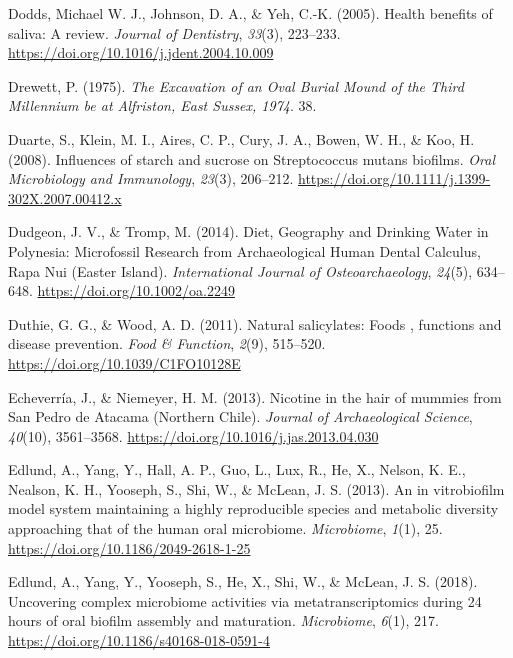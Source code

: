 \documentclass[
  letterpaper,
]{book}
\newlength{\cslhangindent}
\newlength{\cslentryspacingunit} %
\newenvironment{CSLReferences}[2] %
 {%
  \setlength{\parindent}{0pt}
  \ifodd #1
  \let\oldpar\par
  \def\par{\hangindent=\cslhangindent\oldpar}
  \fi
  \setlength{\parskip}{#2\cslentryspacingunit}
 }%
 {}
\begin{document}
\begin{CSLReferences}{1}{0}
\leavevmode{}%
Dodds, Michael W. J., Johnson, D. A., \& Yeh, C.-K. (2005). Health
benefits of saliva: A review. \emph{Journal of Dentistry}, \emph{33}(3),
223--233. \url{https://doi.org/10.1016/j.jdent.2004.10.009}

\leavevmode{}%
Drewett, P. (1975). \emph{The {Excavation} of an {Oval Burial Mound} of
the {Third Millennium} be at {Alfriston}, {East Sussex}, 1974}. 38.

\leavevmode{}%
Duarte, S., Klein, M. I., Aires, C. P., Cury, J. A., Bowen, W. H., \&
Koo, H. (2008). Influences of starch and sucrose on {Streptococcus}
mutans biofilms. \emph{Oral Microbiology and Immunology}, \emph{23}(3),
206--212. \url{https://doi.org/10.1111/j.1399-302X.2007.00412.x}

\leavevmode{}%
Dudgeon, J. V., \& Tromp, M. (2014). Diet, {Geography} and {Drinking
Water} in {Polynesia}: {Microfossil Research} from {Archaeological Human
Dental Calculus}, {Rapa Nui} ({Easter Island}). \emph{International
Journal of Osteoarchaeology}, \emph{24}(5), 634--648.
\url{https://doi.org/10.1002/oa.2249}

\leavevmode{}%
Duthie, G. G., \& Wood, A. D. (2011). Natural salicylates: Foods ,
functions and disease prevention. \emph{Food \& Function}, \emph{2}(9),
515--520. \url{https://doi.org/10.1039/C1FO10128E}

\leavevmode{}%
Echeverría, J., \& Niemeyer, H. M. (2013). Nicotine in the hair of
mummies from {San Pedro} de {Atacama} ({Northern Chile}). \emph{Journal
of Archaeological Science}, \emph{40}(10), 3561--3568.
\url{https://doi.org/10.1016/j.jas.2013.04.030}

\leavevmode{}%
Edlund, A., Yang, Y., Hall, A. P., Guo, L., Lux, R., He, X., Nelson, K.
E., Nealson, K. H., Yooseph, S., Shi, W., \& McLean, J. S. (2013). An in
vitrobiofilm model system maintaining a highly reproducible species and
metabolic diversity approaching that of the human oral microbiome.
\emph{Microbiome}, \emph{1}(1), 25.
\url{https://doi.org/10.1186/2049-2618-1-25}

\leavevmode{}%
Edlund, A., Yang, Y., Yooseph, S., He, X., Shi, W., \& McLean, J. S.
(2018). Uncovering complex microbiome activities via metatranscriptomics
during 24 hours of oral biofilm assembly and maturation.
\emph{Microbiome}, \emph{6}(1), 217.
\url{https://doi.org/10.1186/s40168-018-0591-4}


\end{CSLReferences}
\end{document}
